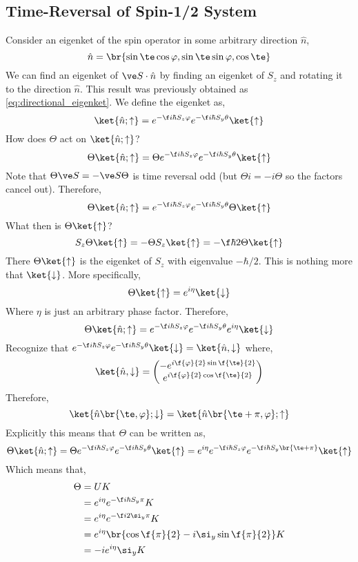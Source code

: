 \documentclass{article}
\begin{document}
\subsection{Time-Reversal of Spin-1/2 System}
Consider an eigenket of the spin operator in some arbitrary direction $\hat n$,
\[ \hat n = \br{\sin\te \cos \varphi, \sin \te \sin \varphi, \cos \te} \]
We can find an eigenket of $\ve S \cdot \hat n$ by finding an eigenket of $S_z$ and rotating it to the direction $\hat n$. This result was previously obtained as \cref{eq:directional_eigenket}.
We define the eigenket as,
\[ \ket{\hat n; \uparrow} = e^{- \f i \hbar S_z \varphi}e^{- \f i \hbar S_y \theta} \ket{\uparrow} \]
How does $\Theta$ act on $\ket{\hat n; \uparrow}$?
\[ \Theta \ket{\hat n; \uparrow} = \Theta e^{- \f i \hbar S_z \varphi}e^{- \f i \hbar S_y \theta} \ket{\uparrow}  \]
Note that $\Theta \ve S = - \ve S \Theta$ is time reversal odd (but $\Theta i = - i \Theta$ so the factors cancel out). Therefore,
\[ \Theta \ket{\hat n; \uparrow} = e^{- \f i \hbar S_z \varphi}e^{- \f i \hbar S_y \theta} \Theta\ket{\uparrow} \]
What then is $\Theta\ket{\uparrow}$?
\[ S_z \Theta \ket{\uparrow} = - \Theta S_z \ket{\uparrow} = - \f \hbar 2 \Theta \ket{\uparrow} \]
There $\Theta \ket{\uparrow}$ is the eigenket of $S_z$ with eigenvalue $-\hbar/2$. This is nothing more that $\ket{\downarrow}$. More specifically,
\[ \Theta \ket{\uparrow} = e^{i \eta} \ket{\downarrow} \]
Where $\eta$ is just an arbitrary phase factor. Therefore,
\[ \Theta \ket{\hat n; \uparrow} = e^{- \f i \hbar S_z \varphi}e^{- \f i \hbar S_y \theta} e^{i\eta}\ket{\downarrow} \]
Recognize that $e^{- \f i \hbar S_z \varphi}e^{- \f i \hbar S_y \theta} \ket{\downarrow} = \ket{\hat n, \downarrow}$ where,
\[ \ket{\hat n, \downarrow} = \begin{pmatrix}
    - e^{i\f{\varphi}{2} \sin \f{\te}{2}} \\
    e^{i\f{\varphi}{2} \cos \f{\te}{2}}
\end{pmatrix} \]
Therefore,
\[ \ket{\hat n \br{\te, \varphi} ; \downarrow} = \ket{\hat n\br{\te + \pi, \varphi}; \uparrow} \]
Explicitly this means that $\Theta$ can be written as,
\[ \Theta \ket{\hat n; \uparrow} = \Theta e^{- \f i \hbar S_z \varphi} e^{- \f i \hbar S_y \theta} \ket{\uparrow} = e^{i \eta}e^{-\f i \hbar S_z \varphi}e^{-\f i \hbar S_y \br{\te + \pi}} \ket{\uparrow} \]
Which means that,
\begin{align*}
\Theta
&= U K \\
&= e^{i \eta} e^{- \f i \hbar S_y \pi} K \\
&= e^{i \eta} e^{- \f i 2 \si_y \pi} K \\
&= e^{i \eta} \br{\cos \f{\pi}{2} - i \si_y \sin \f{\pi}{2}} K \\
&= -ie^{i \eta}\si_y K
\end{align*}
\end{document}
